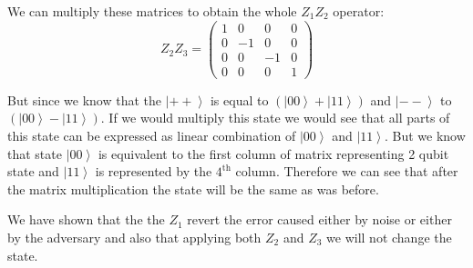 \documentclass[a4paper,10pt]{article}
\newcommand{\ket}[1]{\ensuremath{\left|#1\right\rangle}} %
\begin{document}
\begin{enumerate}[1.]
We can multiply these matrices to obtain the whole $Z_1Z_2$ operator:
$$
Z_2Z_3 = \left(
\begin{array}{cccc}
1& 0& 0& 0 \\
0& -1& 0 &0\\
0 &0& -1& 0\\
0 &0& 0 &1
\end{array}
\right)
$$

But since we know that the \ket{++} is equal to $(\ket{00} +\ket{11})$ and \ket{--} to $(\ket{00} - \ket{11})$. If we would multiply this state we would  see that all parts of this state can be expressed as linear combination of \ket{00} and \ket{11}. But we know that state \ket{00} is equivalent to the first column of matrix representing 2 qubit state and \ket{11} is represented by the $4^{\text{th}}$ column. Therefore we can see that after the matrix multiplication the state will be the same as was before. 

We have shown that the the $Z_1$ revert the error caused either by noise or either by the adversary and also that applying both $Z_2$ and $Z_3$ we will not change the state.
\end{enumerate}
\end{document}
